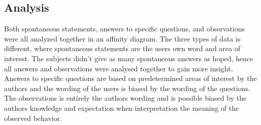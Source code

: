 \subsection{Analysis}
Both spontaneous statements, answers to specific questions, and observations were all analyzed together in an affinity diagram. The three types of data is different, where spontaneous statements are the users own word and area of interest. The subjects didn't give as many spontaneous answers as hoped, hence all answers and observations were analysed together to gain more insight. Answers to specific questions are based on predetermined areas of interest by the authors and the wording of the users is biased by the wording of the questions. The observations is entirely the authors wording and is possible biased by the authors knowledge and expectation when interpretation the meaning of the observed behavior. 